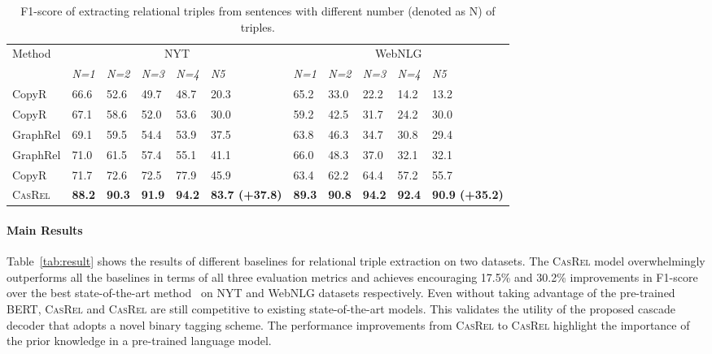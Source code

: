 \documentclass[11pt,a4paper]{article}
\begin{document}
\renewcommand{\arraystretch}{1} \begin{table*}[!tp] 
	\centering
	\small
	\begin{tabular}{lllllllllll} 
		\toprule
		\multirow{2}{*}{Method}& 
		\multicolumn{5}{c}{NYT}&\multicolumn{5}{c}{WebNLG}\\
		\cmidrule(lr){2-6} \cmidrule(lr){7-11} &\textit{N=1}&\textit{N=2}&\textit{N=3}&\textit{N=4}&\textit{N5}
		&\textit{N=1}&\textit{N=2}&\textit{N=3}&\textit{N=4}&\textit{N5}\\
		\midrule 
		CopyR
		&66.6&52.6&49.7&48.7&20.3&65.2&33.0&22.2&14.2&13.2\\ 
		CopyR
		&67.1&58.6&52.0&53.6&30.0&59.2&42.5&31.7&24.2&30.0\\
		GraphRel
		&69.1&59.5&54.4&53.9&37.5&63.8&46.3&34.7&30.8&29.4\\
		GraphRel
		&71.0&61.5&57.4&55.1&41.1&66.0&48.3&37.0&32.1&32.1\\
		CopyR
		&71.7&72.6&72.5&77.9&45.9&63.4&62.2&64.4&57.2&55.7\\
		\midrule
		\textsc{CasRel}&\textbf{88.2}&\textbf{90.3}&\textbf{91.9}&\textbf{94.2}& \textbf{83.7 (+37.8)}&\textbf{89.3}&\textbf{90.8}&\textbf{94.2}&\textbf{92.4}&\textbf{90.9 (+35.2)}\\
		\bottomrule 
	\end{tabular} 
	\caption{F1-score of extracting relational triples from sentences with different number (denoted as N) of triples.}
	\label{tab:result_num} 
\end{table*}


\paragraph{Main Results}
Table~\ref{tab:result} shows the results of different baselines for relational triple extraction on two datasets. The \textsc{CasRel} model overwhelmingly outperforms all the baselines in terms of all three evaluation metrics and achieves encouraging 17.5\% and 30.2\% improvements in F1-score over the best state-of-the-art method~\cite{zeng2019Learning} on NYT and WebNLG datasets respectively. Even without taking advantage of the pre-trained BERT, \textsc{CasRel} and \textsc{CasRel} are still competitive to existing state-of-the-art models. This validates the utility of the proposed cascade decoder that adopts a novel binary tagging scheme. The performance improvements from \textsc{CasRel} to \textsc{CasRel} highlight the importance of the prior knowledge in a pre-trained language model.
\end{document}
